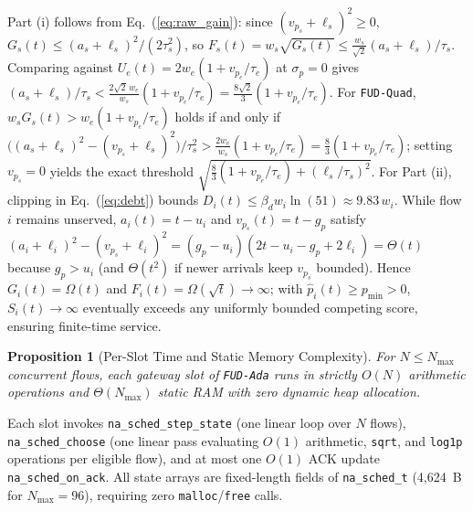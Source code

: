 \documentclass[journal]{IEEEtran}
\newtheorem{proposition}{Proposition}
\begin{document}
\begin{IEEEproof}
Part (i) follows from Eq.~(\ref{eq:raw_gain}): since $(v_{p_s}{+}\ell_s)^2 \ge 0$, $G_s(t) \le (a_s{+}\ell_s)^2/(2\tau_s^2)$, so $F_s(t) = w_s\sqrt{G_s(t)} \le \frac{w_s}{\sqrt{2}}(a_s{+}\ell_s)/\tau_s$. Comparing against $U_e(t) = 2w_e(1{+}v_{p_e}/\tau_e)$ at $\sigma_p{=}0$ gives $(a_s{+}\ell_s)/\tau_s < \frac{2\sqrt{2}\,w_e}{w_s}(1{+}v_{p_e}/\tau_e) = \frac{8\sqrt{2}}{3}(1{+}v_{p_e}/\tau_e)$. For \texttt{FUD-Quad}, $w_s G_s(t) > w_e(1{+}v_{p_e}/\tau_e)$ holds if and only if $\big((a_s{+}\ell_s)^2{-}(v_{p_s}{+}\ell_s)^2\big)/\tau_s^2 > \frac{2w_e}{w_s}(1{+}v_{p_e}/\tau_e) = \frac{8}{3}(1{+}v_{p_e}/\tau_e)$; setting $v_{p_s}{=}0$ yields the exact threshold $\sqrt{\frac{8}{3}(1{+}v_{p_e}/\tau_e) + (\ell_s/\tau_s)^2}$. For Part (ii), clipping in Eq.~(\ref{eq:debt}) bounds $D_i(t) \le \beta_d w_i \ln(51) \approx 9.83\,w_i$. While flow $i$ remains unserved, $a_i(t) = t - u_i$ and $v_{p_s}(t) = t - g_p$ satisfy $(a_i{+}\ell_i)^2 - (v_{p_s}{+}\ell_i)^2 = (g_p{-}u_i)(2t{-}u_i{-}g_p{+}2\ell_i) = \Theta(t)$ because $g_p > u_i$ (and $\Theta(t^2)$ if newer arrivals keep $v_{p_s}$ bounded). Hence $G_i(t) = \Omega(t)$ and $F_i(t) = \Omega(\sqrt{t}) \to \infty$; with $\hat{p}_i(t) \ge p_{\min} > 0$, $S_i(t) \to \infty$ eventually exceeds any uniformly bounded competing score, ensuring finite-time service.
\end{IEEEproof}

\begin{proposition}[Per-Slot Time and Static Memory Complexity]
\label{prop:complexity}
For $N \le N_{\max}$ concurrent flows, each gateway slot of \texttt{FUD-Ada} runs in strictly $O(N)$ arithmetic operations and $\Theta(N_{\max})$ static RAM with zero dynamic heap allocation.
\end{proposition}
\begin{IEEEproof}
Each slot invokes \texttt{na\_sched\_step\_state} (one linear loop over $N$ flows), \texttt{na\_sched\_choose} (one linear pass evaluating $O(1)$ arithmetic, \texttt{sqrt}, and \texttt{log1p} operations per eligible flow), and at most one $O(1)$ ACK update \texttt{na\_sched\_on\_ack}. All state arrays are fixed-length fields of \texttt{na\_sched\_t} (4,624~B for $N_{\max}{=}96$), requiring zero \texttt{malloc}/\texttt{free} calls.
\end{IEEEproof}
\end{document}
